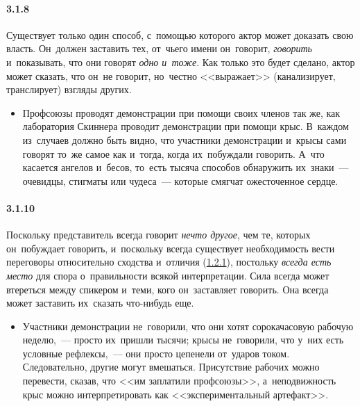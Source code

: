 \paragraph{3.1.8}\hypertarget{par:3.1.8}{} Существует только один способ, с~помощью которого актор может доказать свою власть. Он~должен заставить тех, от~чьего имени он~говорит, {\itshape говорить} и~показывать, что они говорят {\itshape одно и~тоже}. Как только это будет сделано, актор может сказать, что он~не говорит, но~честно <<выражает>> (канализирует, транслирует) взгляды других. 
	\begin{itemize}
	\item 
	Профсоюзы проводят демонстрации при помощи своих членов так же, как лаборатория Скиннера проводит демонстрации при помощи крыс. В~каждом из~случаев должно быть видно, что участники демонстрации и~крысы сами говорят то~же самое как и~тогда, когда их~побуждали говорить. А~что касается ангелов и~бесов, то~есть тысяча способов обнаружить их~знаки~--- очевидцы, стигматы или чудеса~--- которые смягчат  ожесточенное сердце.
	\end{itemize}


\paragraph{3.1.10}\hypertarget{par:3.1.10}{} Поскольку представитель всегда говорит {\itshape нечто другое}, чем те, которых он~побуждает говорить, и~поскольку всегда существует необходимость вести переговоры относительно сходства и~отличия (\hyperlink{par:1.2.1}{1.2.1}), постольку {\itshape всегда есть место} для спора о~правильности всякой интерпретации. Сила всегда может втереться между спикером и~теми, кого он~заставляет говорить. Она всегда может заставить их~сказать что-нибудь еще. 
	\begin{itemize}
	\item 
	Участники демонстрации не~говорили, что они хотят сорокачасовую рабочую неделю,~--- просто их~пришли тысячи; крысы не~говорили, что у~них есть условные рефлексы,~--- они просто цепенели от~ударов током. Следовательно, другие могут вмешаться. Присутствие рабочих можно перевести, сказав, что <<им заплатили профсоюзы>>, а~неподвижность крыс можно интерпретировать как <<экспериментальный артефакт>>.
	\end{itemize}

